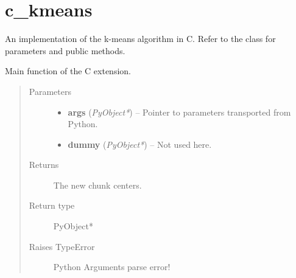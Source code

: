 \documentclass[letterpaper,10pt,english]{sphinxmanual}
\begin{document}
\section{c\_kmeans}
\label{kmeans:module-spscicomp.kmeans.extension.c_kmeans}\label{kmeans:c-kmeans}

\begin{fulllineitems}
\label{kmeans:spscicomp.kmeans.extension.c_kmeans.CKmeans}
An implementation of the k-means algorithm in C. Refer to the {\hyperref[kmeans:kmeans.DefaultKmeans]{}} class for parameters and
public methods.

\end{fulllineitems}


\begin{fulllineitems}
\label{kmeans:c.cal_chunk_centers}
Main function of the C extension.
\begin{quote}\begin{description}
\item[{Parameters}] \leavevmode\begin{itemize}
\item {} 
\textbf{args} (\emph{PyObject*}) -- Pointer to parameters transported from Python.

\item {} 
\textbf{dummy} (\emph{PyObject*}) -- Not used here.

\end{itemize}

\item[{Returns}] \leavevmode
The new chunk centers.

\item[{Return type}] \leavevmode
PyObject*

\item[{Raises TypeError}] \leavevmode
Python Arguments parse error!

\end{description}\end{quote}

\end{fulllineitems}
\end{document}
